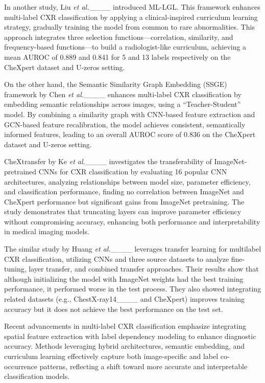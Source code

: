 In another study, Liu \textit{et al.}____ introduced ML-LGL. This framework enhances multi-label CXR classification by applying a clinical-inspired curriculum learning strategy, gradually training the model from common to rare abnormalities. This approach integrates three selection functions—correlation, similarity, and frequency-based functions—to build a radiologist-like curriculum, achieving a mean AUROC of 0.889 and 0.841 for 5 and 13 labels respectively on the CheXpert dataset and U-zeros setting.

On the other hand, the Semantic Similarity Graph Embedding (SSGE) framework by Chen \textit{et al.}____ enhances multi-label CXR classification by embedding semantic relationships across images, using a “Teacher-Student” model. By combining a similarity graph with CNN-based feature extraction and GCN-based feature recalibration, the model achieves consistent, semantically informed features, leading to an overall AUROC score of 0.836 on the CheXpert dataset and U-zeros setting.

CheXtransfer by Ke \textit{et al.}____ investigates the transferability of ImageNet-pretrained CNNs for CXR classification by evaluating 16 popular CNN architectures, analyzing relationships between model size, parameter efficiency, and classification performance, finding no correlation between ImageNet and CheXpert performance but significant gains from ImageNet pretraining. The study demonstrates that truncating layers can improve parameter efficiency without compromising accuracy, enhancing both performance and interpretability in medical imaging models.

The similar study by Huang \textit{et al.}____ leverages transfer learning for multilabel CXR classification, utilizing CNNs and three source datasets to analyze fine-tuning, layer transfer, and combined transfer approaches. Their results show that although initializing the model with ImageNet weights had the best training performance, it performed worse in the test process. They also showed integrating related datasets (e.g., ChestX-ray14____ and CheXpert) improves training accuracy but it does not achieve the best performance on the test set.

Recent advancements in multi-label CXR classification emphasize integrating spatial feature extraction with label dependency modeling to enhance diagnostic accuracy. Methods leveraging hybrid architectures, semantic embedding, and curriculum learning effectively capture both image-specific and label co-occurrence patterns, reflecting a shift toward more accurate and interpretable classification models.

